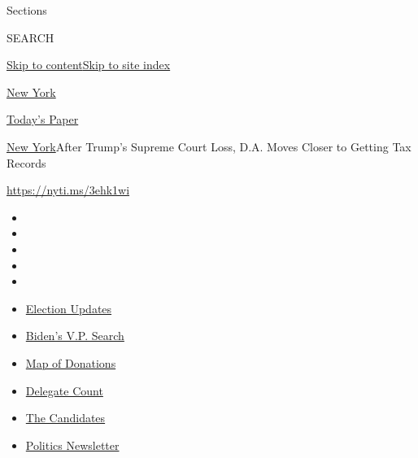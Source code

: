 Sections

SEARCH

\protect\hyperlink{site-content}{Skip to
content}\protect\hyperlink{site-index}{Skip to site index}

\href{https://www.nytimes3xbfgragh.onion/section/nyregion}{New York}

\href{https://myaccount.nytimes3xbfgragh.onion/auth/login?response_type=cookie\&client_id=vi}{}

\href{https://www.nytimes3xbfgragh.onion/section/todayspaper}{Today's
Paper}

\href{/section/nyregion}{New York}\textbar{}After Trump's Supreme Court
Loss, D.A. Moves Closer to Getting Tax Records

\url{https://nyti.ms/3ehk1wi}

\begin{itemize}
\item
\item
\item
\item
\item
\end{itemize}

\begin{itemize}
\item
  \href{https://www.nytimes3xbfgragh.onion/2020/08/03/us/elections/biden-vs-trump.html?action=click\&pgtype=Article\&state=default\&region=TOP_BANNER\&context=storylines_menu}{Election
  Updates}
\item
  \href{https://www.nytimes3xbfgragh.onion/article/biden-vice-president-2020.html?action=click\&pgtype=Article\&state=default\&region=TOP_BANNER\&context=storylines_menu}{Biden's
  V.P. Search}
\item
  \href{https://www.nytimes3xbfgragh.onion/interactive/2020/07/24/us/politics/trump-biden-campaign-donors.html?action=click\&pgtype=Article\&state=default\&region=TOP_BANNER\&context=storylines_menu}{Map
  of Donations}
\item
  \href{https://www.nytimes3xbfgragh.onion/interactive/2020/us/elections/delegate-count-primary-results.html?action=click\&pgtype=Article\&state=default\&region=TOP_BANNER\&context=storylines_menu}{Delegate
  Count}
\item
  \href{https://www.nytimes3xbfgragh.onion/interactive/2019/us/politics/2020-presidential-candidates.html?action=click\&pgtype=Article\&state=default\&region=TOP_BANNER\&context=storylines_menu}{The
  Candidates}
\item
  \href{https://www.nytimes3xbfgragh.onion/newsletters/politics?action=click\&pgtype=Article\&state=default\&region=TOP_BANNER\&context=storylines_menu}{Politics
  Newsletter}
\end{itemize}

